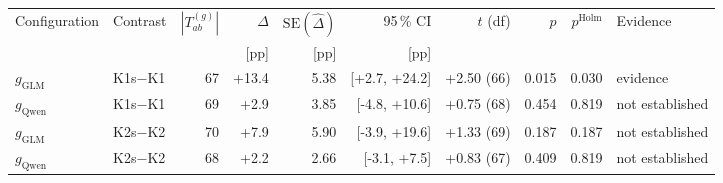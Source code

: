 \begin{tabular}{@{}llrrrrrrrl@{}}
  \toprule
  Configuration & Contrast & $|T^{(g)}_{ab}|$ & $\widehat\Delta$ & $\mathrm{SE}(\widehat\Delta)$ & 95\,\% CI & $t$ (df) & $p$ & $p^{\mathrm{Holm}}$ & Evidence \\
   & & & [pp] & [pp] & [pp] & & & & \\
  \midrule
  $g_{\mathrm{GLM}}$ & K1s$-$K1 & 67 & +13.4 & 5.38 & [+2.7, +24.2] & +2.50 (66) & 0.015 & 0.030 & evidence \\
  \rowcolor{black!6} $g_{\mathrm{Qwen}}$ & K1s$-$K1 & 69 & +2.9 & 3.85 & [-4.8, +10.6] & +0.75 (68) & 0.454 & 0.819 & not established \\
  $g_{\mathrm{GLM}}$ & K2s$-$K2 & 70 & +7.9 & 5.90 & [-3.9, +19.6] & +1.33 (69) & 0.187 & 0.187 & not established \\
  \rowcolor{black!6} $g_{\mathrm{Qwen}}$ & K2s$-$K2 & 68 & +2.2 & 2.66 & [-3.1, +7.5] & +0.83 (67) & 0.409 & 0.819 & not established \\
  \bottomrule
\end{tabular}
